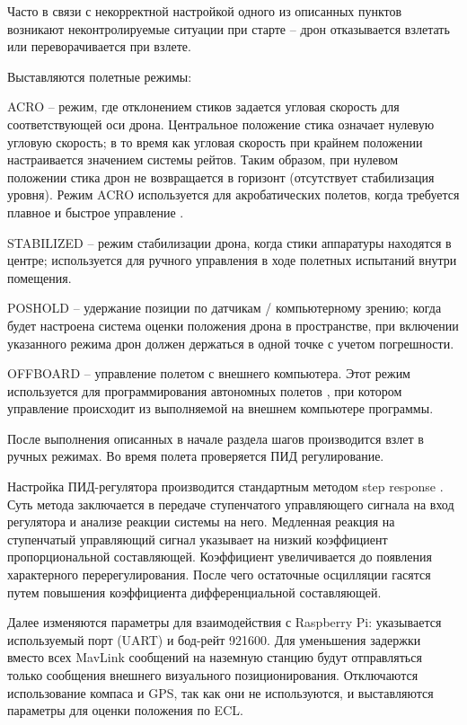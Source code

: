Часто в связи с некорректной настройкой одного из описанных пунктов возникают неконтролируемые ситуации при старте -- дрон отказывается взлетать или переворачивается при взлете.

Выставляются полетные режимы:

ACRO -- режим, где отклонением стиков задается угловая скорость для соответствующей оси дрона. Центральное положение стика означает нулевую угловую скорость; в то время как угловая скорость при крайнем положении настраивается значением системы рейтов. Таким образом, при нулевом положении стика дрон не возвращается в горизонт (отсутствует стабилизация уровня). Режим ACRO используется для акробатических полетов, когда требуется плавное и быстрое управление \cite{ardupilot}.

STABILIZED -- режим стабилизации дрона, когда стики аппаратуры находятся в центре; используется для ручного управления в ходе полетных испытаний внутри помещения.

POSHOLD -- удержание позиции по датчикам / компьютерному зрению; когда будет настроена система оценки положения дрона в пространстве, при включении указанного режима дрон должен держаться в одной точке с учетом погрешности.

OFFBOARD -- управление полетом с внешнего компьютера. Этот режим используется для программирования автономных полетов \cite{clover}, при котором управление происходит из выполняемой на внешнем компьютере программы.

После выполнения описанных в начале раздела шагов производится взлет в ручных режимах. Во время полета проверяется ПИД регулирование.

Настройка ПИД-регулятора производится стандартным методом step res\-ponse \cite{tau}. Суть метода заключается в передаче ступенчатого управляющего сигнала на вход регулятора и анализе реакции системы на него.
Медленная реакция на ступенчатый управляющий сигнал указывает на низкий коэффициент пропорциональной составляющей.
Коэффициент увеличивается до появления характерного перерегулирования.
После чего остаточные осцилляции гасятся путем повышения коэффициента дифференциальной составляющей.

Далее изменяются параметры для взаимодействия с Raspberry Pi: указывается используемый порт (UART) и бод-рейт 921600.
Для уменьшения задержки вместо всех MavLink сообщений на наземную станцию будут отправляться только сообщения внешнего визуального позиционирования.
Отключаются использование компаса и GPS, так как они не используются, и выставляются параметры для оценки положения по ECL.

